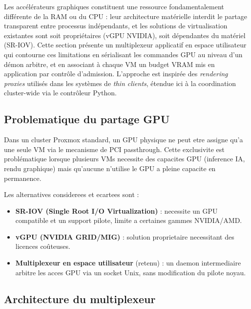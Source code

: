 Les accélérateurs graphiques constituent une ressource fondamentalement différente de la RAM ou du CPU : leur architecture matérielle interdit le partage transparent entre processus indépendants, et les solutions de virtualisation existantes sont soit propriétaires (vGPU NVIDIA), soit dépendantes du matériel (SR-IOV). Cette section présente un multiplexeur applicatif en espace utilisateur qui contourne ces limitations en sérialisant les commandes GPU au niveau d'un démon arbitre, et en associant à chaque VM un budget VRAM mis en application par contrôle d'admission. L'approche est inspirée des \textit{rendering proxies} utilisés dans les systèmes de \textit{thin clients}, étendue ici à la coordination cluster-wide via le contrôleur Python.

\subsection{Problematique du partage GPU}
\label{subsec:problematique-gpu}

Dans un cluster Proxmox standard, un GPU physique ne peut etre assigne qu'a une seule VM via le mecanisme de PCI passthrough. Cette exclusivite est probl\'ematique lorsque plusieurs VMs necessite des capacites GPU (inference IA, rendu graphique) mais qu'aucune n'utilise le GPU a pleine capacite en permanence.

Les alternatives considerees et ecartees sont :

\begin{itemize}
    \item \textbf{SR-IOV (Single Root I/O Virtualization)} : necessite un GPU compatible et un support pilote, limite a certaines gammes NVIDIA/AMD.
    \item \textbf{vGPU (NVIDIA GRID/MIG)} : solution proprietaire necessitant des licences co\^uteuses.
    \item \textbf{Multiplexeur en espace utilisateur} (retenu) : un daemon intermediaire arbitre les acces GPU via un socket Unix, sans modification du pilote noyau.
\end{itemize}

\subsection{Architecture du multiplexeur}
\label{subsec:architecture-mux}

